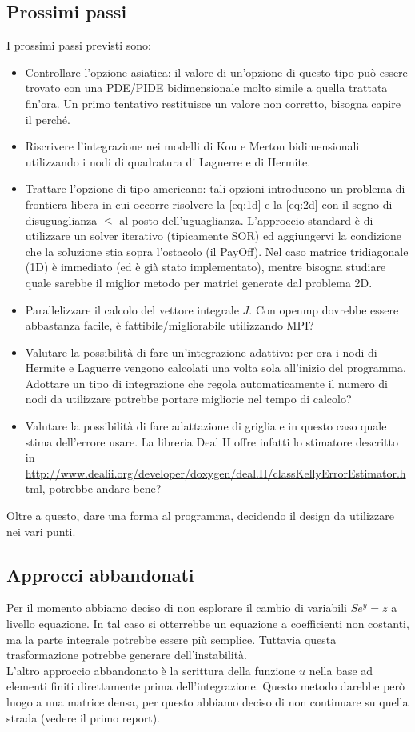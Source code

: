 \documentclass[a4paper,10pt]{article}
\begin{document}
\subsection{Prossimi passi}
I prossimi passi previsti sono:
\begin{itemize}
 \item Controllare l'opzione asiatica: il valore di un'opzione di questo tipo può essere trovato con una PDE/PIDE bidimensionale molto simile a quella trattata fin'ora. Un primo tentativo restituisce un valore non corretto, bisogna capire il perché.
 \item Riscrivere l'integrazione nei modelli di Kou e Merton bidimensionali utilizzando i nodi di quadratura di Laguerre e di Hermite.
 \item Trattare l'opzione di tipo americano: tali opzioni introducono un problema di frontiera libera in cui occorre risolvere la \eqref{eq:1d} e la \eqref{eq:2d} con il segno di disuguaglianza $\leq$ al posto dell'uguaglianza. L'approccio standard è di utilizzare un solver iterativo (tipicamente SOR) ed aggiungervi la condizione che la soluzione stia sopra l'ostacolo (il PayOff). Nel caso matrice tridiagonale (1D) è immediato (ed \`e gi\`a stato implementato), mentre bisogna studiare quale sarebbe il miglior metodo per matrici generate dal problema 2D.
 \item Parallelizzare il calcolo del vettore integrale $J$. Con openmp dovrebbe essere abbastanza facile, è fattibile/migliorabile utilizzando MPI?
 \item Valutare la possibilit\`a di fare un'integrazione adattiva: per ora i nodi di Hermite e Laguerre vengono calcolati una volta sola all'inizio del programma. Adottare un tipo di integrazione che regola automaticamente il numero di nodi da utilizzare potrebbe portare migliorie nel tempo di calcolo?
 \item Valutare la possibilità di fare adattazione di griglia e in questo caso quale stima dell'errore usare. La libreria Deal II offre infatti lo stimatore descritto in \url{http://www.dealii.org/developer/doxygen/deal.II/classKellyErrorEstimator.html}, potrebbe andare bene?
\end{itemize}

Oltre a questo, dare una forma al programma, decidendo il design da utilizzare nei vari punti. 

\subsection{Approcci abbandonati}
Per il momento abbiamo deciso di non esplorare il cambio di variabili $Se^y=z$ a livello equazione. In tal caso si otterrebbe un equazione a coefficienti non costanti, ma la parte integrale potrebbe essere più semplice. Tuttavia questa trasformazione potrebbe generare dell'instabilit\`a.\\
L'altro approccio abbandonato \`e la scrittura della funzione $u$ nella base ad elementi finiti direttamente prima dell'integrazione. Questo metodo darebbe però luogo a una matrice densa, per questo abbiamo deciso di non continuare su quella strada (vedere il primo report).
\end{document}
